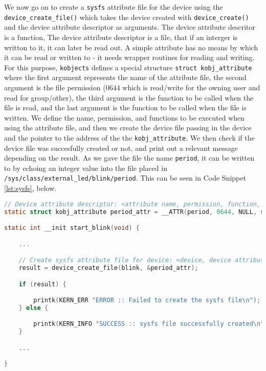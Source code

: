 \documentclass[a4paper,oneside,onecolumn]{article}
\newcommand{\code}[1]{\colorbox{codegray}{\texttt{#1}}}
\begin{document}
We now go on to create a \texttt{sysfs} attribute file for the device using the \code{device\_create\_file()} which takes the device created with \code{device\_create()} and the device attribute descriptor as arguments. The device attribute descritor is a function, The device attribute descriptor is a file, that if an interger is writton to it, it can later be read out. A simple attribute has no means by which it can be read or written to - it needs wrapper routines for reading and writing. For this purpose, \texttt{kobjects} defines a special structure \code{struct kobj\_attribute} where the first argument represents the name of the attribute file, the second argument is the file permission (0644 which is read/write for the owning user and read for group/other), the third argument is the function to be called when the file is read, and the last argument is the function to be called when the file is written.
\newline
\newline
We define the name, permission, and functions to be executed when using the attribute file, and then we create the device file passing in the device and the pointer to the address of the the \code{kobj\_attribute}. We then check if the device file was succesfully created or not, and print out a relevant message depending on the result.
\newline
As we gave the file the name \texttt{period}, it can be written to by echoing an integer value into the file placed in \texttt{/sys/class/external\_led/blink/period}.
\newline
This can be seen in Code Snippet \ref{lst:sysfs}, below.

\begin{lstlisting}[language=c, label={lst:sysfs}, caption={Creating a \texttt{sysfs} Attribute File}]
// Device attribute descriptor: <attribute name, permission, function, function>
static struct kobj_attribute period_attr = __ATTR(period, 0644, NULL, store_period);

static int __init start_blink(void) {

    ...

    // Create sysfs attribute file for device: <device, device attribute descriptor>
    result = device_create_file(blink, &period_attr);

    if (result) {

        printk(KERN_ERR "ERROR :: Failed to create the sysfs file\n");
    } else {

        printk(KERN_INFO "SUCCESS :: sysfs file successfully created\n");
    }

    ...

}
\end{lstlisting}
\end{document}
